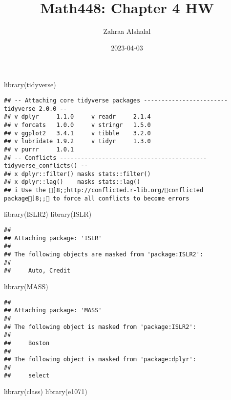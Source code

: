 \documentclass[
]{article}
\title{Math448: Chapter 4 HW}
\author{Zahraa Alshalal}
\date{2023-04-03}
\newenvironment{Shaded}{\begin{snugshade}}{\end{snugshade}}
\newcommand{\FunctionTok}[1]{\textcolor[rgb]{0.00,0.00,0.00}{#1}}
\newcommand{\NormalTok}[1]{#1}
\begin{document}
\maketitle

\begin{Shaded}
\begin{Highlighting}[]
\FunctionTok{library}\NormalTok{(tidyverse)}
\end{Highlighting}
\end{Shaded}

\begin{verbatim}
## -- Attaching core tidyverse packages ------------------------ tidyverse 2.0.0 --
## v dplyr     1.1.0     v readr     2.1.4
## v forcats   1.0.0     v stringr   1.5.0
## v ggplot2   3.4.1     v tibble    3.2.0
## v lubridate 1.9.2     v tidyr     1.3.0
## v purrr     1.0.1     
## -- Conflicts ------------------------------------------ tidyverse_conflicts() --
## x dplyr::filter() masks stats::filter()
## x dplyr::lag()    masks stats::lag()
## i Use the ]8;;http://conflicted.r-lib.org/conflicted package]8;; to force all conflicts to become errors
\end{verbatim}

\begin{Shaded}
\begin{Highlighting}[]
\FunctionTok{library}\NormalTok{(ISLR2)}
\FunctionTok{library}\NormalTok{(ISLR)}
\end{Highlighting}
\end{Shaded}

\begin{verbatim}
## 
## Attaching package: 'ISLR'
## 
## The following objects are masked from 'package:ISLR2':
## 
##     Auto, Credit
\end{verbatim}

\begin{Shaded}
\begin{Highlighting}[]
\FunctionTok{library}\NormalTok{(MASS)}
\end{Highlighting}
\end{Shaded}

\begin{verbatim}
## 
## Attaching package: 'MASS'
## 
## The following object is masked from 'package:ISLR2':
## 
##     Boston
## 
## The following object is masked from 'package:dplyr':
## 
##     select
\end{verbatim}

\begin{Shaded}
\begin{Highlighting}[]
\FunctionTok{library}\NormalTok{(class)}
\FunctionTok{library}\NormalTok{(e1071)}
\end{Highlighting}
\end{Shaded}
\end{document}
